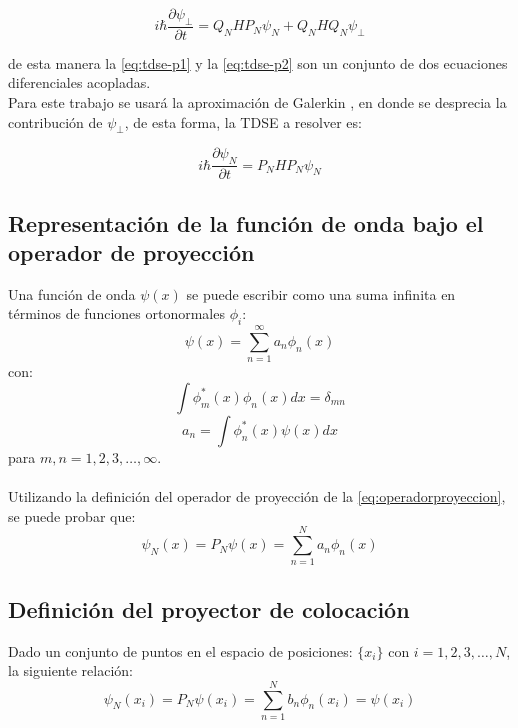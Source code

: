 \begin{equation}
  \label{eq:tdse-p2}
  i\hbar\frac{\partial \psi_{\perp}}{\partial t} = Q_NHP_N\psi_N + Q_NHQ_N\psi_{\perp}
\end{equation}

de esta manera la \autoref{eq:tdse-p1} y la \autoref{eq:tdse-p2} son un conjunto de dos ecuaciones diferenciales acopladas.
\\
Para este trabajo se usará la aproximación de Galerkin \cite{Gottlieb}, en donde se desprecia la contribución de $\psi_{\perp}$, de esta forma, la \acs{TDSE} a resolver es:
\begin{tcolorbox}[colback=CTtitle!5!white,colframe=CTtitle!85!white]%
\begin{equation}
\label{eq:TDSEN}
i\hbar \frac{\partial \psi_N}{\partial t} = P_NHP_N\psi_N
\end{equation}
\end{tcolorbox}

\subsection{Representación de la función de onda bajo el operador de proyección}

Una función de onda $\psi(x)$ se puede escribir como una suma infinita en términos de funciones ortonormales $\phi_i$:
\begin{equation}
  \label{eq:wavefuninf}
  \psi(x) = \sum_{n=1}^{\infty}a_n\phi_n(x)
\end{equation}
con:
\[ \int \phi_m^*(x)\phi_n(x)dx = \delta_{mn} \]
\[ a_n = \int \phi_n^*(x)\psi(x)dx\]
para $m,n=1,2,3,\dots, \infty$.
\\
\\
Utilizando la definición del operador de proyección de la \autoref{eq:operadorproyeccion}, se puede probar que:
\begin{equation}
  \label{eq:wavepacketinit}
  \psi_N(x) = P_N\psi(x)=\sum_{n=1}^{N}a_n\phi_n(x)
\end{equation}

\subsection{Definición del proyector de colocación}\label{sec:collocation}
Dado un conjunto de puntos en el espacio de posiciones: $\{x_i\}$ con $i=1,2,3,\dots, N$, la siguiente relación:
\begin{equation}
  \label{eq:wavefunexp}
  \psi_N(x_i) = P_N\psi(x_i)=\sum_{n=1}^{N}b_n\phi_n(x_i) = \psi(x_i)
\end{equation}

